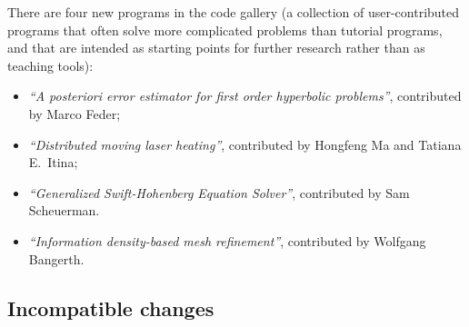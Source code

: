 \documentclass{ansarticle-preprint}
\begin{document}

There are four new programs in the code gallery (a collection of
user-contributed programs that often solve more complicated problems
than tutorial programs, and that are intended as starting points for further
research rather than as teaching tools):
\begin{itemize}
  \item \textit{``A posteriori error estimator for first order hyperbolic problems''},
  contributed by Marco Feder;
  \item \textit{``Distributed moving laser heating''}, contributed by
  Hongfeng Ma and Tatiana E.~Itina;
  \item \textit{``Generalized Swift-Hohenberg Equation Solver''}, contributed by
    Sam Scheuerman.
  \item \textit{``Information density-based mesh refinement''},
    contributed by Wolfgang Bangerth.
\end{itemize}


\subsection{Incompatible changes}\label{subsec:deprecated}
\end{document}
